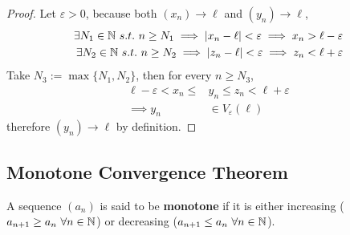 \documentclass[11pt]{article}
\begin{document}
	\begin{proof}
%		
	Let $\varepsilon > 0$, because both $(x_n) \to \ell$ and $(y_n) \to \ell$,
	\begin{align}
		\exists N_1 \in \mathbb{N} \ s.t.\ n \geq N_1 \implies |x_n - \ell| < \varepsilon \implies x_n > \ell - \varepsilon \\
		\exists N_2 \in \mathbb{N} \ s.t.\ n \geq N_2 \implies |z_n - \ell| < \varepsilon \implies z_n < \ell +  \varepsilon
	\end{align}
	Take $N_3 := \max\{N_1, N_2\}$, then for every $n \geq N_3$,
	\begin{align}
		\ell - \varepsilon < x_n \leq &y_n \leq z_n < \ell + \varepsilon \\
		\implies y_n &\in V_\varepsilon(\ell)
	\end{align}
	therefore $(y_n) \to \ell$ by definition.
	\end{proof}
	
	\subsection{Monotone Convergence Theorem}
	\begin{definition}
		A sequence $(a_n)$ is said to be \textbf{monotone} if it is either increasing ($a_{n+1} \geq a_n\ \forall n \in \mathbb{N}$) or decreasing ($a_{n+1} \leq a_n\ \forall n \in \mathbb{N}$).
	\end{definition}
	
\end{document}

